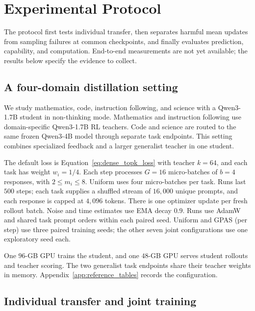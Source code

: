 \section{Experimental Protocol}
\label{sec:experiments}

The protocol first tests individual transfer, then separates harmful mean
updates from sampling failures at common checkpoints, and finally evaluates
prediction, capability, and computation. End-to-end measurements are not yet
available; the results below specify the evidence to collect.

\subsection{A four-domain distillation setting}

We study mathematics, code, instruction following, and science with a
Qwen3-1.7B student in non-thinking mode. Mathematics and instruction
following use domain-specific Qwen3-1.7B RL teachers. Code and science
are routed to the same frozen Qwen3-4B model through separate task
endpoints. This setting combines specialized feedback and a larger
generalist teacher in one student.

The default loss is Equation~\ref{eq:dense_topk_loss} with teacher
$k=64$, and each task has weight $w_i=1/4$. Each step processes
$G=16$ micro-batches of $b=4$ responses, with $2\leq m_i\leq8$.
Uniform uses four micro-batches per task. Runs last $500$ steps;
each task supplies a shuffled stream of $16{,}000$ unique prompts,
and each response is capped at $4{,}096$ tokens. There is one optimizer
update per fresh rollout batch. Noise and time estimates use EMA decay
$0.9$. Runs use AdamW and shared task prompt orders within each paired seed.
Uniform and GPAS (per step) use three paired training seeds; the other seven
joint configurations use one exploratory seed each.

One $96$-GB GPU trains the student, and one $48$-GB GPU serves
student rollouts and teacher scoring. The two generalist task endpoints
share their teacher weights in memory. Appendix~\ref{app:reference_tables}
records the configuration.

\subsection{Individual transfer and joint training}

